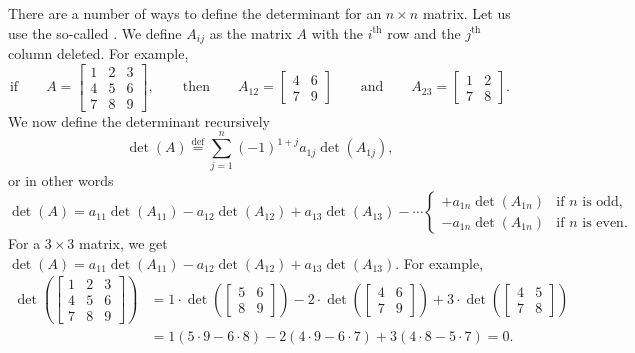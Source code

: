 There are a number of ways to define the determinant for an $n \times n$
matrix.  Let us use the so-called \emph{}.
We define $A_{ij}$ as
the matrix $A$ with the $i^{\text{th}}$ row and the $j^{\text{th}}$ column
deleted.  For example,
\begin{equation*}
\text{if} \qquad
A =
\begin{bmatrix}
1 & 2 & 3 \\
4 & 5 & 6 \\
7 & 8 & 9
\end{bmatrix} ,
\qquad
\text{then}
\qquad
A_{12} =
\begin{bmatrix}
4 & 6 \\
7 & 9
\end{bmatrix}
\qquad
\text{and}
\qquad
A_{23} =
\begin{bmatrix}
1 & 2 \\
7 & 8
\end{bmatrix} .
\end{equation*}
We now define the determinant recursively
\begin{equation*}
\det (A)
\overset{\text{def}}{=}
\sum_{j=1}^n
{(-1)}^{1+j}
a_{1j} \det (A_{1j}) ,
\end{equation*}
or in other words
\begin{equation*}
\det (A) =
a_{11} \det (A_{11}) -
a_{12} \det (A_{12}) +
a_{13} \det (A_{13}) -
\cdots
\begin{cases}
+ a_{1n} \det (A_{1n}) & \text{if } n \text{ is odd,} \\
- a_{1n} \det (A_{1n}) & \text{if } n \text{ is even.}
\end{cases}
\end{equation*}
For a $3 \times 3$ matrix,
we get $\det (A) = a_{11} \det (A_{11}) -
a_{12} \det (A_{12}) + a_{13} \det (A_{13})$.  For example,
\begin{equation*}
\begin{split}
\det \left(
\begin{bmatrix}
1 & 2 & 3 \\
4 & 5 & 6 \\
7 & 8 & 9
\end{bmatrix}
\right)
& =
1 \cdot
\det \left(
\begin{bmatrix}
5 & 6 \\
8 & 9
\end{bmatrix}
\right)
-
2 \cdot
\det \left(
\begin{bmatrix}
4 & 6 \\
7 & 9
\end{bmatrix}
\right)
+
3 \cdot
\det \left(
\begin{bmatrix}
4 & 5 \\
7 & 8
\end{bmatrix}
\right) \\
& =
1 (5 \cdot 9 - 6 \cdot 8)
-
2 (4 \cdot 9 - 6 \cdot 7)
+
3 (4 \cdot 8 - 5 \cdot 7)
= 0 .
\end{split}
\end{equation*}

